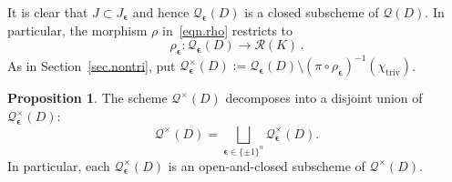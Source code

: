 \documentclass[12pt,reqno]{amsart}
\newcommand{\calQ}{\mathcal{Q}}
\newcommand{\calR}{\mathcal{R}}
\theoremstyle{definition}
\newtheorem{proposition}[theorem]{Proposition}
\begin{document}
	It is clear that $J\subset J_{\boldsymbol{\epsilon}}$ and hence $\calQ_{\boldsymbol{\epsilon}}(D)$ is a closed subscheme of $\calQ(D)$. In particular, the morphism $\rho$ in~\eqref{eqn.rho} restricts to
	\begin{equation} \label{eqn.res}
		\rho_{\boldsymbol{\epsilon}} : \calQ_{\boldsymbol{\epsilon}}(D) \longrightarrow \calR(K)\, .
	\end{equation}
	As in Section~\ref{sec.nontri}, put $\calQ^\times_{\boldsymbol{\epsilon}}(D):=\calQ_{\boldsymbol{\epsilon}}(D)\setminus (\pi\circ\rho_{\boldsymbol{\epsilon}})^{-1}(\chi_\mathrm{triv})$.
	\begin{proposition}\label{prop:decomp} 
		The scheme $\calQ^\times(D)$ decomposes into a disjoint union of $\calQ^\times_{\boldsymbol{\epsilon}}(D)$:
		\begin{equation*}
			\calQ^\times(D) = \bigsqcup_{\boldsymbol{\epsilon}\in\{\pm1\}^n}
			\calQ_{\boldsymbol{\epsilon}}^\times(D).
		\end{equation*}
		In particular, each
		$\calQ_{\boldsymbol{\epsilon}}^\times(D)$
		is an open-and-closed subscheme of $\calQ^\times(D)$.
	\end{proposition}
	
\end{document}
